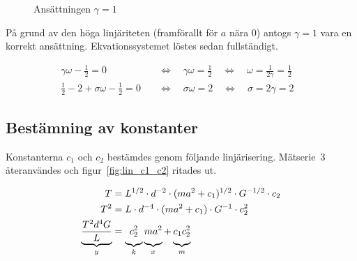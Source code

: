 \documentclass[a4paper,12pt]{article}
\begin{document}
\begin{figure}[h!]
  \caption{Ansättningen $\gamma = 1$}
  \label{fig:lin_c}
\end{figure}

På grund av den höga linjäriteten (framförallt för $a$ nära 0) antogs $\gamma =
1$ vara en korrekt ansättning. Ekvationssystemet löstes sedan fullständigt.

\begin{align}
  \gamma\omega - \frac{1}{2} = 0 \quad &\Leftrightarrow \quad \gamma\omega = \frac{1}{2} \quad \Leftrightarrow \quad \omega = \frac{1}{2\gamma} = \frac{1}{2} & \\[0.5em]
  \frac{1}{2} - 2 + \sigma\omega - \frac{1}{2} = 0 \quad &\Leftrightarrow \quad \sigma\omega = 2 \quad \Leftrightarrow \quad \sigma = 2\gamma = 2 &
\end{align}

\subsection{Bestämning av konstanter}

Konstanterna $c_1$ och $c_2$ bestämdes genom följande linjärisering.
Mätserie~3 återanvändes och figur~\ref{fig:lin_c1_c2} ritades ut.

\begin{align}
  T &= L^{1/2} \cdot d^{-2} \cdot (m a^2 + c_1)^{1/2} \cdot G^{-1/2} \cdot c_2 \nonumber \\
  T^2 &= L \cdot d^{-4} \cdot (m a^2 + c_1) \cdot G^{-1} \cdot c_2^2 \nonumber \\
  \underbrace{\frac{T^2 d^4 G}{L}}_y &= \underbrace{c_2^2 \vphantom{\frac{T^2 d^4 G}{L}}}_k \underbrace{m a^2 \vphantom{\frac{T^2 d^4 G}{L}}}_x + \underbrace{c_1c_2^2 \vphantom{\frac{T^2 d^4 G}{L}}}_m
\end{align}
\end{document}
